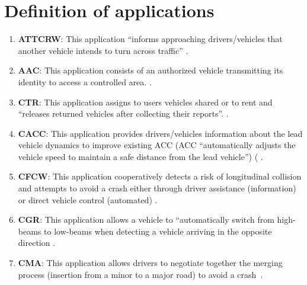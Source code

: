 \section{Definition of applications}\label{appendix:app}
\begin{enumerate}
\item \textbf{\acrfull{ATTCRW}}: This application ``informs approaching drivers/vehicles that another vehicle intends to turn across traffic'' \cite{etsi_etsi_tr_102_638_intelligent_2009,j_vehicle--vehicle_2014,al-sultan_comprehensive_2014,miucic_v2x_2018,cailean_survey_2014,xu_dsrc_2017,zeadally_tutorial_2020,usdt_intelligent_2021}.
\item \textbf{\acrfull{AAC}}: This application consists of an authorized vehicle transmitting its identity to access a controlled area. \cite{etsi_etsi_tr_102_638_intelligent_2009}.
\item \textbf{\acrfull{CTR}}: This application assigns to users vehicles shared or to rent and ``releases returned vehicles after collecting their reports''. \cite{etsi_etsi_tr_102_638_intelligent_2009,3gpp_tr_22886_3rd_2018}.
\item \textbf{\acrfull{CACC}}: This application provides drivers/vehicles information about the lead vehicle dynamics to improve existing \acrfull{ACC} (\acrshort{ACC} ``automatically adjusts the vehicle speed to maintain a safe distance from the lead vehicle'') ( \cite{etsi_etsi_tr_102_638_intelligent_2009,papadimitratos_vehicular_2009,brown_review_2019,zeadally_tutorial_2020,zeng_potential_2012,chang_estimated_2015,usdt_intelligent_2021}.
\item \textbf{\acrfull{CFCW}}: This application cooperatively detects a risk of longitudinal collision and attempts to avoid a crash either through driver assistance (information) or direct vehicle control (automated) \cite{etsi_etsi_tr_102_638_intelligent_2009,papadimitratos_vehicular_2009,brown_review_2019,boban_use_2017,3gpp_tr_22886_3rd_2018,raza_social_2018,karagiannis_vehicular_2011,chang_intelligent_2010,cailean_survey_2014, xu_dsrc_2017,bila_vehicles_2017,5gpp_5g_2015,gupta_medium_2015,dey_vehicle--vehicle_2016,xiang_research_2014,ye_v2v_2008,usdt_intelligent_2021}.
\item \textbf{\acrfull{CGR}}: This application allows a vehicle to ``automatically switch from high-beams to low-beams when detecting a vehicle arriving in the opposite direction \cite{etsi_etsi_tr_102_638_intelligent_2009,brown_review_2019}.
\item \textbf{\acrfull{CMA}}: This application allows drivers to negotiate together the merging process (insertion from a minor to a major road) to avoid a crash~\cite{etsi_etsi_tr_102_638_intelligent_2009,papadimitratos_vehicular_2009,j_vehicle--vehicle_2014,al-sultan_comprehensive_2014,karagiannis_vehicular_2011}.

\end{enumerate}
